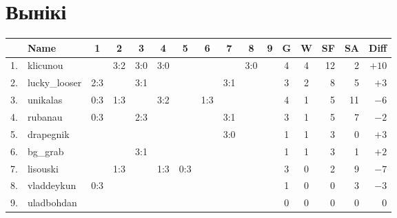 \section{Вынікі}

\begin{tabular}{|l|l|c|c|c|c|c|c|c|c|c|c|c|r|r|r|}
    \hline
       & Name          & 1      & 2       & 3      & 4       & 5      & 6       & 7      & 8       & 9                      & G & W & SF & SA &  Diff \\ \hline
    1. & klicunou      & \cellcolor{pink} & 3:2    & 3:0     & 3:0    &         &        &         & 3:0    &               & 4 & 4 & 12 &  2 & $+10$ \\ \hline
    2. & lucky\_looser & 2:3              & \cellcolor{pink} & 3:1    &         &        &         & 3:1    &         &     & 3 & 2 &  8 &  5 &  $+3$ \\ \hline
    3. & unikalas      & 0:3    & 1:3     & \cellcolor{pink} & 3:2    &         &  1:3   &         &        &               & 4 & 1 &  5 & 11 &  $-6$ \\ \hline
    4. & rubanau       & 0:3    &         & 2:3              & \cellcolor{pink} &        &         & 3:1    &         &     & 3 & 1 &  5 &  7 &  $-2$ \\ \hline
    5. & drapegnik     &        &         &        &         & \cellcolor{pink} &        & 3:0     &        &               & 1 & 1 &  3 &  0 &  $+3$ \\ \hline
    6. & bg\_grab      &        &         & 3:1    &         &                  & \cellcolor{pink} &        &         &     & 1 & 1 &  3 &  1 &  $+2$ \\ \hline
    7. & lisouski      &        & 1:3     &        & 1:3     & 0:3    &         & \cellcolor{pink} &        &               & 3 & 0 &  2 &  9 &  $-7$ \\ \hline
    8. & vladdeykun    & 0:3    &         &        &         &        &         &                  & \cellcolor{pink} &     & 1 & 0 &  0 &  3 &  $-3$ \\ \hline
    9. & uladbohdan    &        &         &        &         &        &         &        &         & \cellcolor{pink}       & 0 & 0 &  0 &  0 &   $0$ \\ \hline
\end{tabular}
